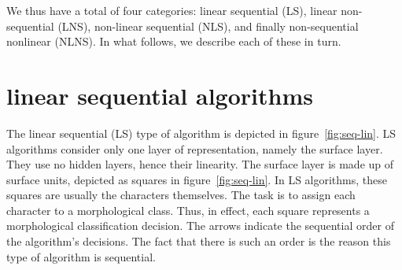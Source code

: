  We thus have a total of four categories: linear sequential (LS),
 linear non-sequential  (LNS), non-linear sequential  (NLS), and finally
 non-sequential nonlinear (NLNS). In what follows, we describe each of these in turn.


\section{linear sequential algorithms}
\label{subsec:seq-lin}

The linear sequential (LS) type of algorithm is depicted in figure~\ref{fig:seq-lin}. 
LS algorithms consider only one layer of representation, namely the surface layer. They use no hidden layers, hence their linearity. The surface layer is made up of surface units, depicted as squares in figure~\ref{fig:seq-lin}.
In LS algorithms, these squares are usually the characters themselves. 
The task is to assign each character to a morphological class. Thus, in effect, 
each square represents a morphological classification decision.
The arrows indicate the sequential order of the algorithm's decisions. 
The fact that there is such an order is the reason this type of algorithm is sequential.

